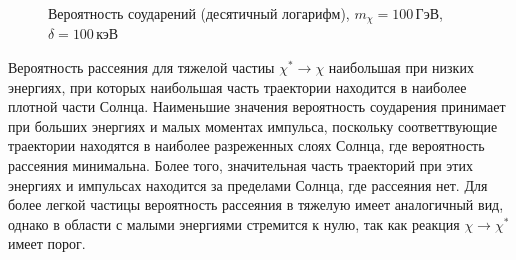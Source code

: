 \begin{figure}[!h]
\label{plot:C_LH_minus}
\caption{Вероятность соударений (десятичный логарифм), $m_{\chi} = 100 \, \text{ГэВ}$, $\delta = 100 \, \text{кэВ}$}
\end{figure}

Вероятность рассеяния для тяжелой частиы $\chi^* \rightarrow \chi$ наибольшая при низких энергиях, при которых наибольшая часть траектории находится в наиболее плотной части Солнца. Наименьшие значения вероятность соударения принимает при больших энергиях и малых моментах импульса, поскольку соответтвующие траектории находятся в наиболее разреженных слоях Солнца, где вероятность рассеяния минимальна. Более того, значительная часть траекторий при этих энергиях и импульсах находится за пределами Солнца, где рассеяния нет.
Для более легкой частицы вероятность рассеяния в тяжелую имеет аналогичный вид, однако в области с малыми энергиями стремится к нулю, так как реакция $\chi \rightarrow \chi^*$ имеет порог.

